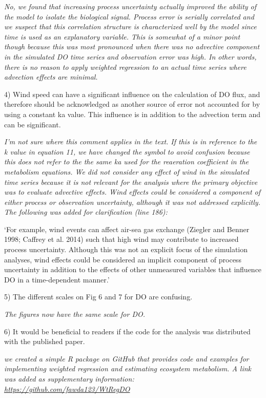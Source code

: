 \documentclass[letterpaper,12pt]{article}\usepackage[]{graphicx}\usepackage[]{color}
\begin{document}
{\it No, we found that increasing process uncertainty actually improved the ability of the model to isolate the biological signal.  Process error is serially correlated and we suspect that this correlation structure is characterized well by the model since time is used as an explanatory variable.  This is somewhat of a minor point though because this was most pronounced when there was no advective component in the simulated DO time series and observation error was high.  In other words, there is no reason to apply weighted regression to an actual time series where advection effects are minimal.}

4) Wind speed can have a significant influence on the calculation of DO flux, and therefore should be acknowledged as another source of error not accounted for by using a constant ka value. This influence is in addition to the advection term and can be significant.

{\it I'm not sure where this comment applies in the text.  If this is in reference to the k value in equation 11, we have changed the symbol to avoid confusion because this does not refer to the the same ka used for the reaeration coefficient in the metabolism equations.  We did not consider any effect of wind in the simulated time series because it is not relevant for the analysis where the primary objective was to evaluate advective effects.  Wind effects could be considered a component of either process or observation uncertainty, although it was not addressed explicitly.  The following was added for clarification (line 186):

`For example, wind events can affect air-sea gas exchange (Ziegler and Benner 1998; Caffrey et al. 2014) such that high wind may contribute to increased process uncertainty.  Although this was not an explicit focus of the simulation analyses, wind effects could be considered an implicit component of process uncertainty in addition to the effects of other unmeasured variables that influence DO in a time-dependent manner.'
}

5) The different scales on Fig 6 and 7 for DO are confusing. 

{\it The figures now have the same scale for DO.}

6) It would be beneficial to readers if the code for the analysis was distributed with the published paper.

{\it we created a simple R package on GitHub that provides code and examples for implementing weighted regression and estimating ecosystem metabolism. A link was added as supplementary information: \href{https://github.com/fawda123/WtRegDO}{https://github.com/fawda123/WtRegDO}}  
\end{document}
